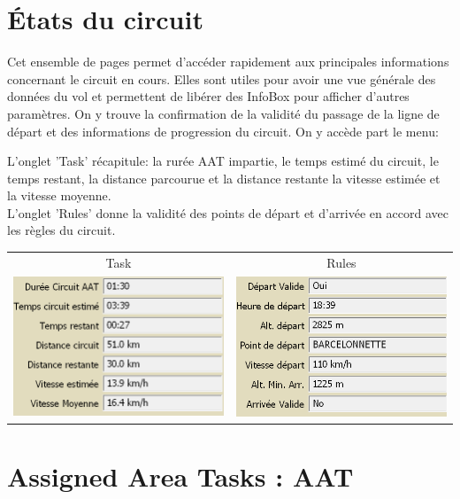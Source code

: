 \section{États du circuit}\label{sec:task-status}

Cet ensemble de pages permet d'accéder rapidement aux principales informations concernant le circuit en cours. Elles sont utiles pour avoir une vue générale des données du vol et permettent de libérer des InfoBox pour afficher d'autres paramètres. On y trouve la confirmation de la validité du passage de la ligne de départ et des informations de progression du circuit. On y accède part le menu:
\begin{quote}
\blink{}
\end{quote}

L'onglet 'Task' récapitule: la rurée AAT impartie, le temps estimé du circuit, le temps restant, la distance parcourue et la distance restante la vitesse estimée et la vitesse moyenne.\\
L'onglet 'Rules' donne la validité des points de départ et d'arrivée en accord avec les règles du circuit.
\begin{center}
\begin{tabular}{c c}
Task & Rules \\
\includegraphics[angle=0,width=0.4\linewidth,keepaspectratio='true']{figures/status-task.png} &
\includegraphics[angle=0,width=0.4\linewidth,keepaspectratio='true']{figures/status-rules.png} \\
\end{tabular}
\end{center}

\section{Assigned Area Tasks : AAT}\label{sec:aat-tasks}

